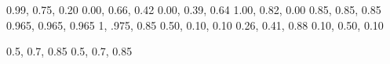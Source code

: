 \definecolor{amber}{rgb} {0.99, 0.75, 0.20}
\definecolor{jade}{rgb}  {0.00, 0.66, 0.42}
\definecolor{blue}{rgb}  {0.00, 0.39, 0.64}
\definecolor{gold}{rgb}  {1.00, 0.82, 0.00}
\definecolor{lightgrey}{rgb}  {0.85, 0.85, 0.85}
\definecolor{offwhite}{rgb}   {0.965, 0.965, 0.965}
\definecolor{paleyellow}{rgb} {1, .975, 0.85}
\definecolor{bordeaux}{rgb}   {0.50, 0.10, 0.10}
\definecolor{royalblue}{rgb}  {0.26, 0.41, 0.88}
\definecolor{darkgreen}{rgb}  {0.10, 0.50, 0.10}

\definecolor{titleCiteAColor}{rgb} {0.5, 0.7, 0.85}
\definecolor{titleCiteColor}{rgb}  {0.5, 0.7, 0.85}


\hypersetup{
    citecolor=,  %
    colorlinks=true,
    linkcolor=blue,
    filecolor=magenta,      
    urlcolor=cyan,
}


\let\plainCiteA\citeA
\renewcommand{\citeA}[2][gray]{{\color{#1}\plainCiteA{#2}}}
\let\plainCite\cite
\renewcommand{\cite}[2][gray]{{\color{#1}\plainCite{#2}}}

\newcommand{\titleCiteA}[1]{\citeA[titleCiteAColor]{#1}}
\newcommand{\titleCite}[1]{\cite[titleCiteColor]{#1}}


\newcommand{\given}{{ \mid }}

\newcommand{\lxor}{\veebar}
\renewcommand{\l}[1]{\mbox{ \sc{#1} }}

\renewcommand{\therefore}{\Rightarrow}
\renewcommand{\implies}{\rightarrow}
\newcommand{\equivalent}{\leftrightarrow}
\newcommand{\nonequivalent}{\not\leftrightarrow}


\usepackage{graphicx}
\graphicspath{ {p/} }

\usetikzlibrary{trees}
\usetikzlibrary{tikzmark}


\author[shortname]{Joachim Vandekerckhove\\Michael D. Lee}
\date{}

